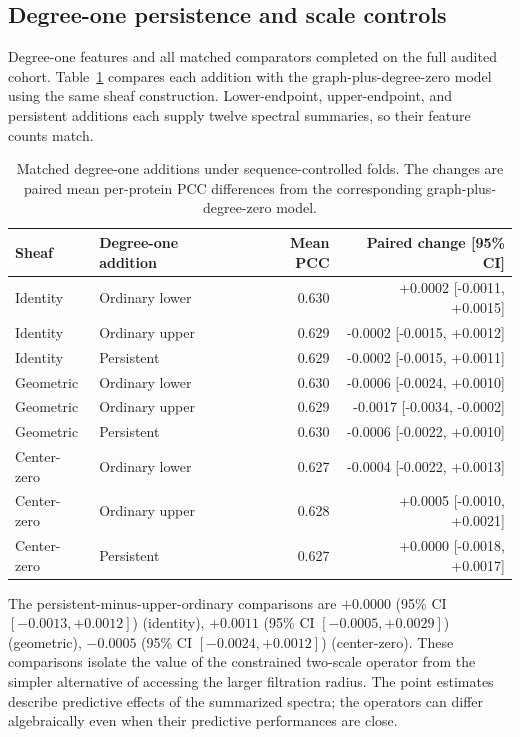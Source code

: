 \subsection{Degree-one persistence and scale controls}
Degree-one features and all matched comparators completed on the full audited cohort. Table~\ref{tab:persistence} compares each addition with the graph-plus-degree-zero model using the same sheaf construction. Lower-endpoint, upper-endpoint, and persistent additions each supply twelve spectral summaries, so their feature counts match.


\begin{table}[htbp]\centering\small
\caption{Matched degree-one additions under sequence-controlled folds. The changes are paired mean per-protein PCC differences from the corresponding graph-plus-degree-zero model.}
\label{tab:persistence}
\begin{tabular}{llrr}\toprule
Sheaf & Degree-one addition & Mean PCC & Paired change [95\% CI]\\\midrule
Identity & Ordinary lower & 0.630 & +0.0002 [-0.0011, +0.0015] \\
Identity & Ordinary upper & 0.629 & -0.0002 [-0.0015, +0.0012] \\
Identity & Persistent & 0.629 & -0.0002 [-0.0015, +0.0011] \\
Geometric & Ordinary lower & 0.630 & -0.0006 [-0.0024, +0.0010] \\
Geometric & Ordinary upper & 0.629 & -0.0017 [-0.0034, -0.0002] \\
Geometric & Persistent & 0.630 & -0.0006 [-0.0022, +0.0010] \\
Center-zero & Ordinary lower & 0.627 & -0.0004 [-0.0022, +0.0013] \\
Center-zero & Ordinary upper & 0.628 & +0.0005 [-0.0010, +0.0021] \\
Center-zero & Persistent & 0.627 & +0.0000 [-0.0018, +0.0017] \\
\bottomrule\end{tabular}\end{table}


The persistent-minus-upper-ordinary comparisons are $+0.0000$ (95\% CI $[-0.0013, +0.0012]$) (identity), $+0.0011$ (95\% CI $[-0.0005, +0.0029]$) (geometric), $-0.0005$ (95\% CI $[-0.0024, +0.0012]$) (center-zero). These comparisons isolate the value of the constrained two-scale operator from the simpler alternative of accessing the larger filtration radius. The point estimates describe predictive effects of the summarized spectra; the operators can differ algebraically even when their predictive performances are close.


